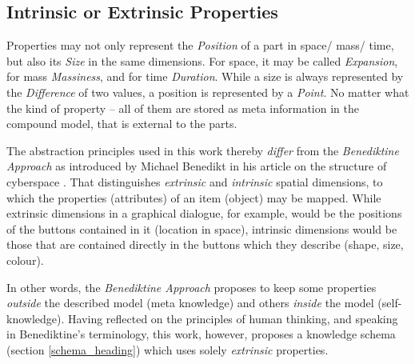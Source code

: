 %
%
%
%
%
%
%

\subsection{Intrinsic or Extrinsic Properties}
\label{intrinsic_or_extrinsic_properties_heading}

Properties may not only represent the \emph{Position} of a part in space/ mass/
time, but also its \emph{Size} in the same dimensions. For space, it may be
called \emph{Expansion}, for mass \emph{Massiness}, and for time \emph{Duration}.
While a size is always represented by the \emph{Difference} of two values, a
position is represented by a \emph{Point}. No matter what the kind of property
-- all of them are stored as meta information in the compound model, that is
external to the parts.

The abstraction principles used in this work thereby \emph{differ} from the
\emph{Benediktine Approach} as introduced by Michael Benedikt in his article on
the structure of cyberspace \cite{benedikt}. That distinguishes \emph{extrinsic}
and \emph{intrinsic} spatial dimensions, to which the properties (attributes)
of an item (object) may be mapped. While extrinsic dimensions in a graphical
dialogue, for example, would be the positions of the buttons contained in it
(location in space), intrinsic dimensions would be those that are contained
directly in the buttons which they describe (shape, size, colour).

In other words, the \emph{Benediktine Approach} proposes to keep some
properties \emph{outside} the described model (meta knowledge) and others
\emph{inside} the model (self-knowledge). Having reflected on the principles of
human thinking, and speaking in Benediktine's terminology, this work, however,
proposes a knowledge schema (section \ref{schema_heading}) which uses solely
\emph{extrinsic} properties.
